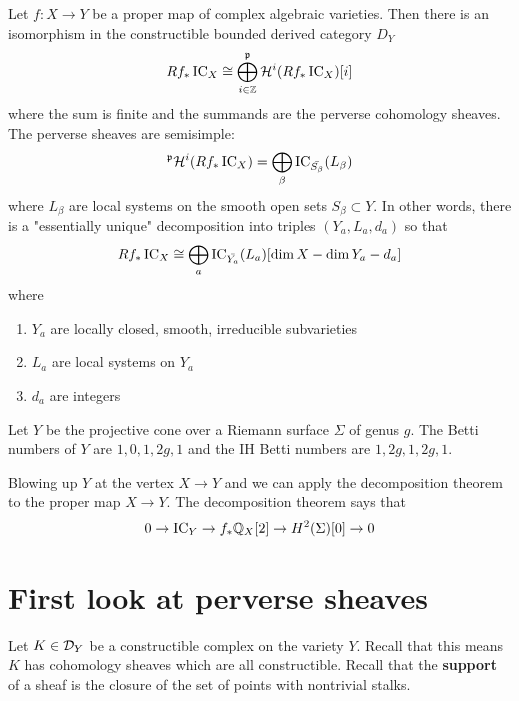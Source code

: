 \documentclass[12pt]{article}
\begin{document}
\begin{theorem}
    Let $f:X\to Y$ be a proper map of complex algebraic varieties. Then
    there is an isomorphism in the constructible bounded derived category $D_Y$ \begin{align*}
        Rf_*\operatorname{IC}_X \cong \bigoplus_{i\in \mathbb{Z}} ^{\mathfrak{p}}{\mathcal{H}}^i(Rf_*\operatorname{IC}_X)[i]
    \end{align*} where the sum is finite and the summands are the perverse cohomology sheaves.
    The perverse sheaves are semisimple: \begin{align*}
        ^{\mathfrak{p}}{\mathcal{H}}^i(Rf_*\operatorname{IC}_X) = \bigoplus_\beta \operatorname{IC}_{\bar{S_\beta}}(L_\beta)
    \end{align*} where $L_\beta$ are local systems on the smooth open sets
    $S_\beta \subset Y$.
    In other words, there is a "essentially unique"
    decomposition into triples $(Y_a,L_a,d_a)$ so that \begin{align*}
        Rf_*\operatorname{IC}_X \cong \bigoplus_a \operatorname{IC}_{\bar{Y_a}}(L_a)[\dim X - \dim Y_a - d_a]
    \end{align*} where \begin{enumerate}
        \item $Y_a$ are locally closed, smooth, irreducible subvarieties
        \item $L_a$ are local systems on $Y_a$
        \item $d_a$ are integers
    \end{enumerate}
\end{theorem}

\begin{example}
    Let $Y$ be the projective cone over a Riemann surface $\Sigma$ of genus $g$.
    The Betti numbers of $Y$ are $1,0,1,2g,1$ and the IH Betti numbers are $1,2g,1,2g,1$.



    Blowing up $Y$ at the vertex $X\to Y$ and we can apply the decomposition theorem to the
    proper map $X\to Y$. The decomposition theorem says that \begin{align*}
        0 \to \operatorname{IC}_Y \to f_*\mathbb{Q}_X[2] \to H^2(\Sigma)[0]\to 0
    \end{align*}
\end{example}

\section{First look at perverse sheaves}
Let $K\in{\mathcal{D}}_Y$ be a constructible complex on the variety $Y$.
Recall that this means $K$ has cohomology sheaves which are all constructible.
Recall that the \textbf{support} of a sheaf is the closure of the set of points
with nontrivial stalks.
\end{document}

